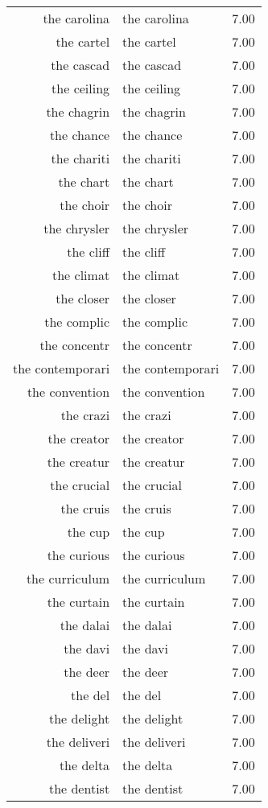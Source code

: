 \begin{table}[ht]
\begin{tabular}{rlr}
  the carolina & the carolina & 7.00 \\ 
  the cartel & the cartel & 7.00 \\ 
  the cascad & the cascad & 7.00 \\ 
  the ceiling & the ceiling & 7.00 \\ 
  the chagrin & the chagrin & 7.00 \\ 
  the chance & the chance & 7.00 \\ 
  the chariti & the chariti & 7.00 \\ 
  the chart & the chart & 7.00 \\ 
  the choir & the choir & 7.00 \\ 
  the chrysler & the chrysler & 7.00 \\ 
  the cliff & the cliff & 7.00 \\ 
  the climat & the climat & 7.00 \\ 
  the closer & the closer & 7.00 \\ 
  the complic & the complic & 7.00 \\ 
  the concentr & the concentr & 7.00 \\ 
  the contemporari & the contemporari & 7.00 \\ 
  the convention & the convention & 7.00 \\ 
  the crazi & the crazi & 7.00 \\ 
  the creator & the creator & 7.00 \\ 
  the creatur & the creatur & 7.00 \\ 
  the crucial & the crucial & 7.00 \\ 
  the cruis & the cruis & 7.00 \\ 
  the cup & the cup & 7.00 \\ 
  the curious & the curious & 7.00 \\ 
  the curriculum & the curriculum & 7.00 \\ 
  the curtain & the curtain & 7.00 \\ 
  the dalai & the dalai & 7.00 \\ 
  the davi & the davi & 7.00 \\ 
  the deer & the deer & 7.00 \\ 
  the del & the del & 7.00 \\ 
  the delight & the delight & 7.00 \\ 
  the deliveri & the deliveri & 7.00 \\ 
  the delta & the delta & 7.00 \\ 
  the dentist & the dentist & 7.00 \\ 

\end{tabular}
\end{table}
